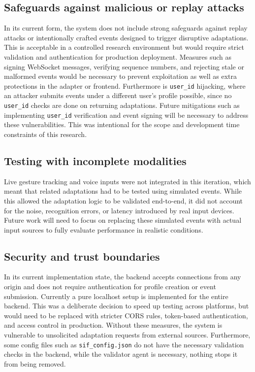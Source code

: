 \subsection{Safeguards against malicious or replay attacks}
In its current form, the system does not include strong safeguards against replay attacks or intentionally crafted events designed to trigger disruptive adaptations. This is acceptable in a controlled research environment but would require strict validation and authentication for production deployment. Measures such as signing WebSocket messages, verifying sequence numbers, and rejecting stale or malformed events would be necessary to prevent exploitation as well as extra protections in the adapter or frontend. Furthermore is \texttt{user\_id} hijacking, where an attacker submits events under a different user’s profile possible, since no \texttt{user\_id} checks are done on returning adaptations. Future mitigations such as implementing \texttt{user\_id} verification and event signing will be necessary to address these vulnerabilities. This was intentional for the scope and development time constraints of this research.

\subsection{Testing with incomplete modalities}
Live gesture tracking and voice inputs were not integrated in this iteration, which meant that related adaptations had to be tested using simulated events. While this allowed the adaptation logic to be validated end-to-end, it did not account for the noise, recognition errors, or latency introduced by real input devices. Future work will need to focus on replacing these simulated events with actual input sources to fully evaluate performance in realistic conditions.

\subsection{Security and trust boundaries}
In its current implementation state, the backend accepts connections from any origin and does not require authentication for profile creation or event submission. Currently a pure localhost setup is implemented for the entire backend. This was a deliberate decision to speed up testing across platforms, but would need to be replaced with stricter CORS rules, token-based authentication, and access control in production. Without these measures, the system is vulnerable to unsolicited adaptation requests from external sources. Furthermore, some config files such as \texttt{sif\_config.json} do not have the necessary validation checks in the backend, while the validator agent is necessary, nothing stops it from being removed.

